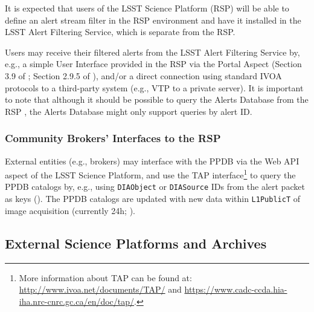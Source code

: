 It is expected that users of the LSST Science Platform (RSP) will be able to define an alert stream filter in the RSP environment and have it installed in the LSST Alert Filtering Service, which is separate from the RSP.

Users may receive their filtered alerts from the LSST Alert Filtering Service by, e.g., a simple User Interface provided in the RSP via the Portal Aspect (Section 3.9 of \citealt{LDM-542}; Section 2.9.5 of \citealt{LDM-554}), and/or a direct connection using standard IVOA protocols to a third-party system (e.g., VTP to a private server).
It is important to note that although it should be possible to query the Alerts Database from the RSP \citep{LDM-542}, the Alerts Database might only support queries by alert ID. 

\subsubsection{Community Brokers' Interfaces to the RSP}\label{sssec:interfaces_rsp_brokers}

External entities (e.g., brokers) may interface with the PPDB via the Web API aspect of the LSST Science Platform, and use the TAP interface\footnote{More information about TAP can be found at: \url{http://www.ivoa.net/documents/TAP/} and \url{https://www.cadc-ccda.hia-iha.nrc-cnrc.gc.ca/en/doc/tap/}.} to query the PPDB catalogs by, e.g., using {\tt DIAObject} or {\tt DIASource} IDs from the alert packet as keys (\citealt{LSE-319,LDM-542,LDM-554}).
The PPDB catalogs are updated with new data within {\tt L1PublicT} of image acquisition (currently 24h; \citealt{LSE-29}). 


\subsection{External Science Platforms and Archives}\label{ssec:interfaces_other}

